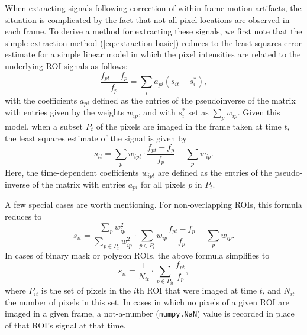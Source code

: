 When extracting signals following correction of within-frame motion artifacts,
the situation is complicated by the fact that not all pixel locations are observed
in each frame.
To derive a method for extracting these signals, we first note that the simple extraction method (\autoref{eq:extraction-basic})
reduces to the least-squares error estimate for a simple linear model in which the 
pixel intensities are related to the underlying ROI signals as follows:
\begin{equation*}
    \frac{f_{pt}-f_p}{f_p} = \sum_i a_{pi} (s_{it} - s_i^*),
\end{equation*}
with the coefficients $a_{pi}$ defined as the entries of the pseudoinverse of the matrix with
entries given by the weights $w_{ip}$,
and with $s_i^*$ set as $\sum_p w_{ip}$.
Given this model, when a subset $P_t$ of the pixels are imaged in the frame taken at time $t$,
the least squares estimate of the signal is given by
\begin{equation*}
    s_{it} = \sum_{p} w_{ipt}\cdot \frac{f_{pt}-f_p}{f_p} + \sum_p w_{ip}.
\end{equation*}
Here, the time-dependent coefficients $w_{ipt}$ are defined as the entries of the pseudo-inverse
of the matrix with entries $a_{pi}$ for all pixels $p$ in $P_t$.

A few special cases are worth mentioning.
For non-overlapping ROIs, this formula reduces to
\begin{equation*}
    s_{it} = \frac{\sum_p w_{ip}^2}{\sum_{p\in P_t} w_{ip}^2}\cdot \sum_{p\in P_t} w_{ip}\frac{f_{pt}-f_p}{f_p} + \sum_p w_{ip}.
\end{equation*}
In cases of binary mask or polygon ROIs, the above formula simplifies to
\begin{equation*}
    s_{it} = \frac{1}{N_{it}}\cdot\sum_{p\in P_{it}}\frac{f_{pt}}{f_p},
\end{equation*}
where $P_{it}$ is the set of pixels in the $i$th ROI that were imaged at time $t$,
and $N_{it}$ the number of pixels in this set.
In cases in which no pixels of a given ROI are imaged in a given frame,
a not-a-number (\verb|numpy.NaN|) value is recorded in place of that ROI's signal at that time.



